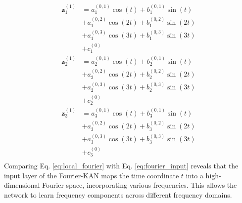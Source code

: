 \documentclass[letterpaper]{article} %
\begin{document}
\begin{equation}
\label{eq:fourier_input}
\begin{aligned}
    \mathbf{z}^{(1)}_1 &= a^{(0,1)}_1 \cos(t) + b^{(0,1)}_1 \sin(t) \\
    & + a^{(0,2)}_1 \cos(2t) + b^{(0,2)}_1 \sin(2t)\\
    & + a^{(0,3)}_1 \cos(3t) + b^{(0,3)}_1 \sin(3t) \\ 
    & + c^{(0)}_1 \\
    \mathbf{z}^{(1)}_2 &= a^{(0,1)}_2 \cos(t) + b^{(0,1)}_2 \sin(t) \\ &
    + a^{(0,2)}_2 \cos(2t) + b^{(0,2)}_2 \sin(2t) \\ &
    + a^{(0,3)}_2 \cos(3t) + b^{(0,3)}_2 \sin(3t)\\ &
    + c^{(0)}_2 \\
    \mathbf{z}^{(1)}_3 &= a^{(0,1)}_3 \cos(t) + b^{(0,1)}_3 \sin(t)\\
    & + a^{(0,2)}_3 \cos(2t) + b^{(0,2)}_3 \sin(2t)\\
    & + a^{(0,3)}_3 \cos(3t) + b^{(0,3)}_3 \sin(3t) \\
    &+ c^{(0)}_3 \\
\end{aligned}
\end{equation}
Comparing Eq. \ref{eq:local_fourier} with Eq. \ref{eq:fourier_input} reveals that the input layer of the Fourier-KAN maps the time coordinate \( t \) into a high-dimensional Fourier space, incorporating various frequencies. This allows the network to learn frequency components across different frequency domains.
\end{document}
